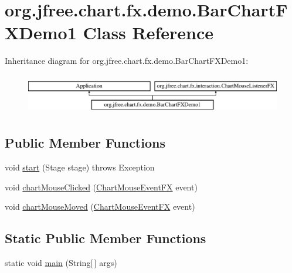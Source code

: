 \hypertarget{classorg_1_1jfree_1_1chart_1_1fx_1_1demo_1_1_bar_chart_f_x_demo1}{}\section{org.\+jfree.\+chart.\+fx.\+demo.\+Bar\+Chart\+F\+X\+Demo1 Class Reference}
\label{classorg_1_1jfree_1_1chart_1_1fx_1_1demo_1_1_bar_chart_f_x_demo1}
Inheritance diagram for org.\+jfree.\+chart.\+fx.\+demo.\+Bar\+Chart\+F\+X\+Demo1\+:\begin{figure}[H]
\begin{center}
\leavevmode
\includegraphics[height=1.783440cm]{classorg_1_1jfree_1_1chart_1_1fx_1_1demo_1_1_bar_chart_f_x_demo1}
\end{center}
\end{figure}
\subsection*{Public Member Functions}
\begin{DoxyCompactItemize}
\item 
void \mbox{\hyperlink{classorg_1_1jfree_1_1chart_1_1fx_1_1demo_1_1_bar_chart_f_x_demo1_a3607e57deabde0c638321318b0455ff9}{start}} (Stage stage)  throws Exception 
\item 
void \mbox{\hyperlink{classorg_1_1jfree_1_1chart_1_1fx_1_1demo_1_1_bar_chart_f_x_demo1_af23c9d454410ccba9b31d1b99ac0f153}{chart\+Mouse\+Clicked}} (\mbox{\hyperlink{classorg_1_1jfree_1_1chart_1_1fx_1_1interaction_1_1_chart_mouse_event_f_x}{Chart\+Mouse\+Event\+FX}} event)
\item 
void \mbox{\hyperlink{classorg_1_1jfree_1_1chart_1_1fx_1_1demo_1_1_bar_chart_f_x_demo1_a4a857882137d18dc9aec3ef0811abf73}{chart\+Mouse\+Moved}} (\mbox{\hyperlink{classorg_1_1jfree_1_1chart_1_1fx_1_1interaction_1_1_chart_mouse_event_f_x}{Chart\+Mouse\+Event\+FX}} event)
\end{DoxyCompactItemize}
\subsection*{Static Public Member Functions}
\begin{DoxyCompactItemize}
\item 
static void \mbox{\hyperlink{classorg_1_1jfree_1_1chart_1_1fx_1_1demo_1_1_bar_chart_f_x_demo1_ae2224667ea72d91951b866ed2158299b}{main}} (String\mbox{[}$\,$\mbox{]} args)
\end{DoxyCompactItemize}


